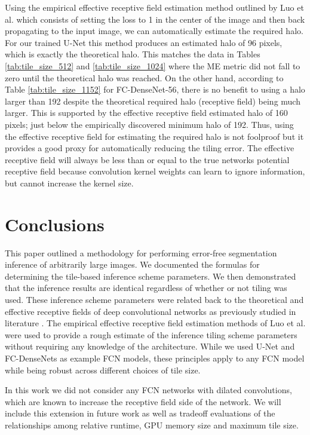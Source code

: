 \documentclass[10pt, indentfirst]{article}
\begin{document}
Using the empirical effective receptive field estimation method outlined by Luo et al. \citep{Luo2016} which consists of setting the loss to 1 in the center of the image and then back propagating to the input image, we can automatically estimate the required halo.
For our trained U-Net \citep{Ronneberger2015a} this method produces an estimated halo of 96 pixels, which is exactly the theoretical halo.
This matches the data in Tables \ref{tab:tile_size_512} and \ref{tab:tile_size_1024} where the ME metric did not fall to zero until the theoretical halo was reached.
On the other hand, according to Table \ref{tab:tile_size_1152} for FC-DenseNet-56, there is no benefit to using a halo larger than 192 despite the theoretical required halo (receptive field) being much larger.
This is supported by the effective receptive field estimated halo of 160 pixels; just below the empirically discovered minimum halo of 192.
Thus, using the effective receptive field for estimating the required halo is not foolproof but it provides a good proxy for automatically reducing the tiling error.
The effective receptive field will always be less than or equal to the true networks potential receptive field because convolution kernel weights can learn to ignore information, but cannot increase the kernel size.


\section{Conclusions}
\label{conclusion}

This paper outlined a methodology for performing error-free segmentation inference of arbitrarily large images.
We documented the formulas for determining the tile-based inference scheme parameters.
We then demonstrated that the inference results are identical regardless of whether or not tiling was used.
These inference scheme parameters were related back to the theoretical and effective receptive fields of deep convolutional networks as previously studied in literature \citep{Luo2016}.
The empirical effective receptive field estimation methods of Luo et al. \citep{Luo2016} were used to provide a rough estimate of the inference tiling scheme parameters without requiring any knowledge of the architecture.
While we used U-Net and FC-DenseNets as example FCN models, these principles apply to any FCN model while being robust across different choices of tile size.

In this work we did not consider any FCN networks with dilated convolutions, which are known to increase the receptive field side of the network.
We will include this extension in future work as well as tradeoff evaluations of the relationships among relative runtime, GPU memory size and maximum tile size.
\end{document}
